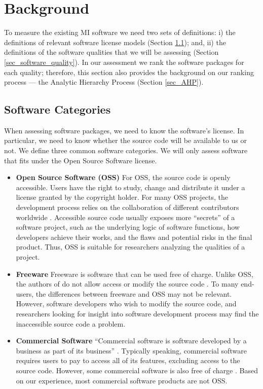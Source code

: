 \documentclass[11pt]{article}
\begin{document}
\section{Background} \label{ch_background}

To measure the existing MI software we need two sets of definitions: i) the
definitions of relevant software license models (Section
\ref{sec_software_categories}); and, ii) the definitions of the software
qualities that we will be assessing (Section \ref{sec_software_quality}). In our
assessment we rank the software packages for each quality; therefore, this
section also provides the background on our ranking process --- the Analytic
Hierarchy Process (Section \ref{sec_AHP}).

\subsection{Software Categories} \label{sec_software_categories}

When assessing software packages, we need to know the software's license.  In
particular, we need to know whether the source code will be available to us or
not.  We define three common software categories.  We will only assess software
that fits under the Open Source Software license.

\begin{itemize}

\item \textbf{Open Source Software (OSS)} For OSS, the source code is openly
accessible. Users have the right to study, change and distribute it under a
license granted by the copyright holder. For many OSS projects, the development
process relies on the collaboration of different contributors worldwide
\citep{Corbly2014}. Accessible source code usually exposes more ``secrets'' of a
software project, such as the underlying logic of software functions, how
developers achieve their works, and the flaws and potential risks in the final
product. Thus, OSS is suitable for researchers analyzing the qualities of a
project.

\item \textbf{Freeware} Freeware is software that can be used free of charge.
Unlike OSS, the authors of do not allow access or modify the source code
\citep{LINFO2006}. To many end-users, the differences between freeware and OSS
may not be relevant. However, software developers who wish to modify the source
code, and researchers looking for insight into software development process may
find the inaccessible source code a problem. 

\item \textbf{Commercial Software} ``Commercial software is software developed
by a business as part of its business'' \citep{GNU2019}. Typically speaking,
commercial software requires users to pay to access all of its features,
excluding access to the source code. However, some commercial software is also
free of charge \citep{GNU2019}. Based on our experience, most commercial
software products are not OSS.

\end{itemize}
\end{document}
